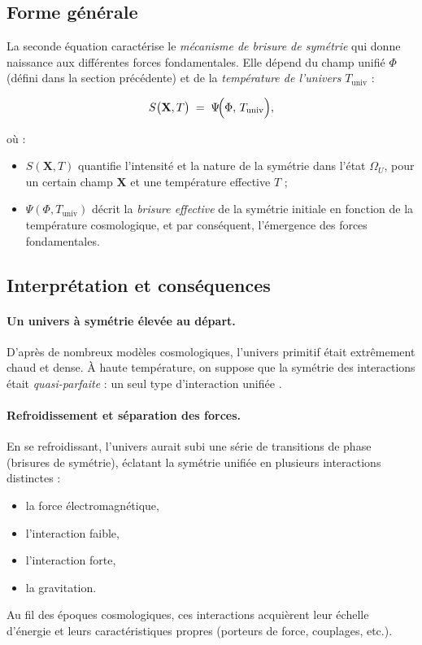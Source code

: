 \documentclass[12pt]{article}
\begin{document}
\subsection{Forme générale}

La seconde équation caractérise le \emph{mécanisme de brisure de symétrie} qui donne 
naissance aux différentes forces fondamentales. Elle dépend du champ unifié $\Phi$ 
(défini dans la section précédente) et de la \emph{température de l'univers} $T_{\mathrm{univ}}$ :

\begin{equation}
\label{eq:brisure_symetrie}
S\bigl(\mathbf{X}, T\bigr) \;=\; \Psi\!\Bigl(\Phi,\, T_{\mathrm{univ}}\Bigr),
\end{equation}

\noindent
où :
\begin{itemize}
    \item $S(\mathbf{X}, T)$ quantifie l'intensité et la nature de la symétrie dans l'état 
          $\Omega_U$, pour un certain champ $\mathbf{X}$ et une température effective $T$ ;
    \item $\Psi(\Phi, T_{\mathrm{univ}})$ décrit la \emph{brisure effective} de la symétrie initiale 
          en fonction de la température cosmologique, et par conséquent, l'émergence 
          des forces fondamentales.
\end{itemize}

\subsection{Interprétation et conséquences}

\paragraph{Un univers à symétrie élevée au départ.}
D'après de nombreux modèles cosmologiques, l'univers primitif était extrêmement chaud 
et dense. À haute température, on suppose que la symétrie des interactions était 
\emph{quasi-parfaite} : un seul type d'interaction unifiée \cite{langacker1981grand}.

\paragraph{Refroidissement et séparation des forces.}
En se refroidissant, l'univers aurait subi une série de transitions de phase (brisures de symétrie), 
éclatant la symétrie unifiée en plusieurs interactions distinctes :
\begin{itemize}
    \item la force électromagnétique,
    \item l'interaction faible,
    \item l'interaction forte,
    \item la gravitation.
\end{itemize}
Au fil des époques cosmologiques, ces interactions acquièrent leur échelle d'énergie et 
leurs caractéristiques propres (porteurs de force, couplages, etc.).
\end{document}
